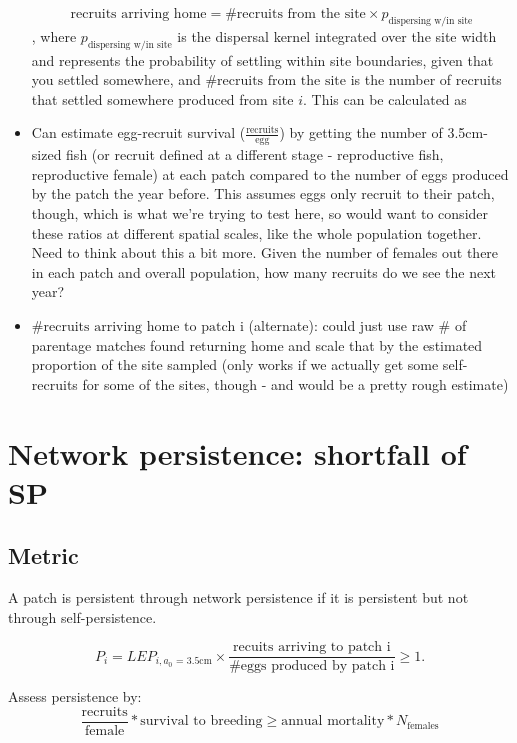 \documentclass[12pt, oneside]{article}   	%
\begin{document}
\begin{itemize}
\[
\text{recruits arriving home} = \text{\# recruits from the site} \times p_{\text{dispersing w/in site}}
\],
where $p_{\text{dispersing w/in site}}$ is the dispersal kernel integrated over the site width and represents the probability of settling within site boundaries, given that you settled somewhere, and $\text{\# recruits from the site}$ is the number of recruits that settled somewhere produced from site $i$. This can be calculated as 
\item Can estimate egg-recruit survival ($\frac{\text{recruits}}{\text{egg}}$) by getting the number of 3.5cm-sized fish (or recruit defined at a different stage - reproductive fish, reproductive female) at each patch compared to the number of eggs produced by the patch the year before. This assumes eggs only recruit to their patch, though, which is what we're trying to test here, so would want to consider these ratios at different spatial scales, like the whole population together. Need to think about this a bit more. Given the number of females out there in each patch and overall population, how many recruits do we see the next year?
\item $\# \text{recruits arriving home to patch i}$ (alternate): could just use raw \# of parentage matches found returning home and scale that by the estimated proportion of the site sampled (only works if we actually get some self-recruits for some of the sites, though - and would be a pretty rough estimate)
\end{itemize}

\section*{Network persistence: shortfall of SP}
\subsection*{Metric}
A patch is persistent through network persistence if it is persistent but not through self-persistence.

\begin{equation}
P_i = LEP_{i, \text{$a_0$ = 3.5cm}} \times \frac{\text{recuits arriving to patch i}}{\# \text{eggs produced by patch i}} \geq 1. %
\end{equation}

Assess persistence by:
\begin{equation}
\frac{\text{recruits}}{\text{female}}*\text{survival to breeding} \geq \text{annual mortality}*N_{\text{females}}
\end{equation}
\end{document}
